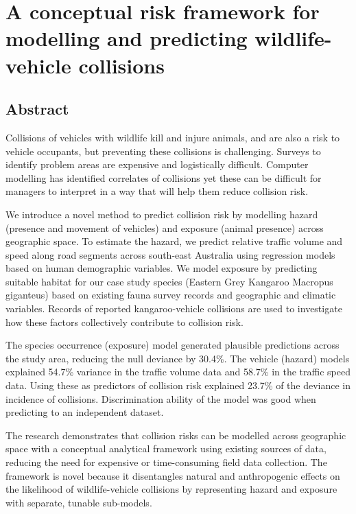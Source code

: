 \chapter{A conceptual risk framework for modelling and predicting wildlife-vehicle collisions}\label{sec:egk}
\newpage

\begin{localsize}{11}
\section*{\centering Abstract}

Collisions of vehicles with wildlife kill and injure animals, and are also a risk to vehicle occupants, but preventing these collisions is challenging. Surveys to identify problem areas are expensive and logistically difficult. Computer modelling has identified correlates of collisions yet these can be difficult for managers to interpret in a way that will help them reduce collision risk.

We introduce a novel method to predict collision risk by modelling hazard (presence and movement of vehicles) and exposure (animal presence) across geographic space. To estimate the hazard, we predict relative traffic volume and speed along road segments across south-east Australia using regression models based on human demographic variables. We model exposure by predicting suitable habitat for our case study species (Eastern Grey Kangaroo Macropus giganteus) based on existing fauna survey records and geographic and climatic variables. Records of reported kangaroo-vehicle collisions are used to investigate how these factors collectively contribute to collision risk.

The species occurrence (exposure) model generated plausible predictions across the study area, reducing the null deviance by 30.4\%. The vehicle (hazard) models explained 54.7\% variance in the traffic volume data and 58.7\% in the traffic speed data. Using these as predictors of collision risk explained 23.7\% of the deviance in incidence of collisions. Discrimination ability of the model was good when predicting to an independent dataset.

The research demonstrates that collision risks can be modelled across geographic space with a conceptual analytical framework using existing sources of data, reducing the need for expensive or time-consuming field data collection. The framework is novel because it disentangles natural and anthropogenic effects on the likelihood of wildlife-vehicle collisions by representing hazard and exposure with separate, tunable sub-models.

\end{localsize}


